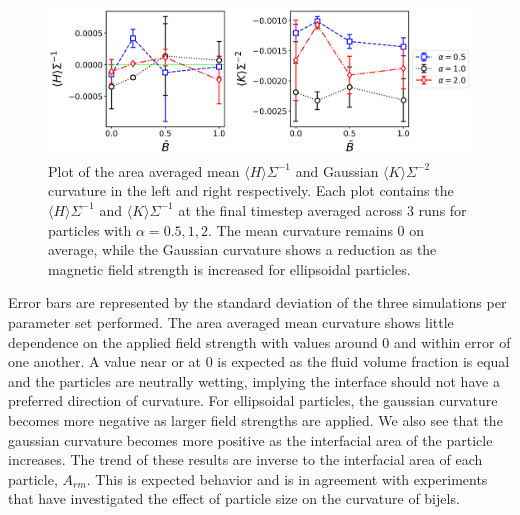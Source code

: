 \begin{figure} 
    \centering 
    \includegraphics[scale = 0.4]{figures/results/paper1/curvature-vs-B_ss.png} 
    \caption{Plot of the area averaged mean $\langle H \rangle \Sigma^{-1}$ and Gaussian 
            $\langle K \rangle \Sigma^{-2}$ curvature in the left and right respectively. Each 
            plot contains the $\langle H \rangle \Sigma^{-1}$ and $\langle K \rangle \Sigma^{-1}$ 
            at the final timestep averaged across 3 runs for particles with $\alpha = 0.5, 1, 2$. 
            The mean curvature remains 0 on average, while the Gaussian 
            curvature shows a reduction as the magnetic field strength is increased for 
            ellipsoidal particles.} 
    \label{fig:curvature-vs-B_ss}
\end{figure}

Error bars are represented by the standard
deviation of the three simulations per parameter set performed. The area
averaged mean curvature shows little dependence on the applied field
strength with values around 0 and within error of one another. A value
near or at 0 is expected as the fluid volume fraction is equal and the
particles are neutrally wetting, implying the interface should not have
a preferred direction of curvature. \cite{jinnai_interfacial_2001} For
ellipsoidal particles, the gaussian curvature becomes more negative as
larger field strengths are applied. We also see that the gaussian
curvature becomes more positive as the interfacial area of the particle
increases. The trend of these results are inverse to the interfacial
area of each particle, \(A_{rm}\). This is expected behavior and is in
agreement with experiments that have investigated the effect of particle
size on the curvature of bijels. \cite{reeves_quantitative_2016}

